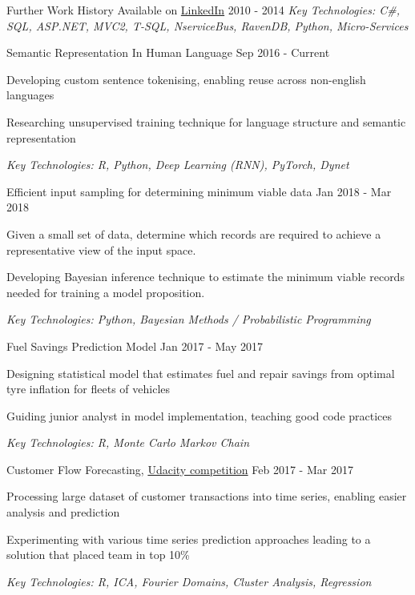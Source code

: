 \documentclass[11pt,article,oneside]{memoir}
\newenvironment{itemize*}{%
  \renewcommand\labelitemi{\textbullet}
  \footnotesize
  \begin{itemize}%
    \setlength{\itemsep}{0pt}}%
  {\end{itemize}
}
\begin{document}
\normalsize
\medskip
\ind Further Work History Available on \href{https://uk.linkedin.com/in/adrian-ionita-6a923129}{LinkedIn} \hfill 2010 - 2014
\ind \hspace{0.35in} \footnotesize \emph{Key Technologies: C\#, SQL, ASP.NET, MVC2, T-SQL, NserviceBus, RavenDB, Python, Micro-Services}

\newpage 


\normalsize
\medskip
\ind Semantic Representation In Human Language \hfill Sep 2016 - Current
\begin{itemize*}
  \item Developing custom sentence tokenising, enabling reuse across non-english languages
  \item Researching unsupervised training technique for language structure and semantic representation
\end{itemize*}
\ind \hspace{0.35in} \footnotesize \emph{Key Technologies: R, Python, Deep Learning (RNN), PyTorch, Dynet}

\normalsize
\medskip
\ind Efficient input sampling for determining minimum viable data \hfill Jan 2018 - Mar 2018
\begin{itemize*}
  \item Given a small set of data, determine which records are required to achieve a representative view of the input space.
  \item Developing Bayesian inference technique to estimate the minimum viable records needed for training a model proposition.
\end{itemize*}
\ind \hspace{0.35in} \footnotesize \emph{Key Technologies: Python, Bayesian Methods / Probabilistic Programming}

\normalsize
\medskip
\ind Fuel Savings Prediction Model \hfill Jan 2017 - May 2017
\begin{itemize*}
  \item Designing statistical model that estimates fuel and repair savings from optimal tyre inflation for fleets of vehicles
  \item Guiding junior analyst in model implementation, teaching good code practices
\end{itemize*}
\ind \hspace{0.35in} \footnotesize \emph{Key Technologies: R, Monte Carlo Markov Chain}

\normalsize
\medskip
\ind Customer Flow Forecasting, \href{https://blog.udacity.com/2017/01/data-science-enthusiasts-win-10000.html}{Udacity competition} \hfill Feb 2017 - Mar 2017
\begin{itemize*}
  \item Processing large dataset of customer transactions into time series, enabling easier analysis and prediction  
  \item Experimenting with various time series prediction approaches leading to a solution that placed team in top 10\%
\end{itemize*}
\ind \hspace{0.35in} \footnotesize \emph{Key Technologies: R, ICA, Fourier Domains, Cluster Analysis, Regression}
\end{document}

